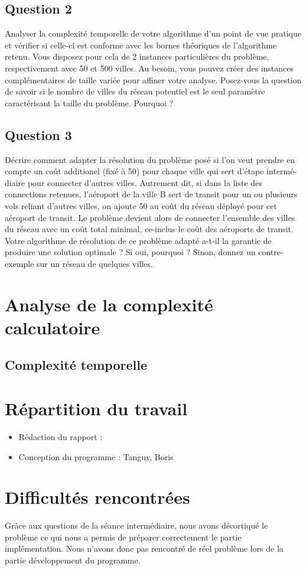 \documentclass[11pt]{article}
\begin{document}
\subsection*{Question 2}
Analyser la complexité temporelle de votre algorithme d’un point de vue pratique
et vérifier si celle-ci est conforme avec les bornes théoriques de l’algorithme retenu.
Vous disposez pour cela de 2 instances particulières du problème, respectivement
avec 50 et 500 villes. Au besoin, vous pouvez créer des instances complémentaires
de taille variée pour affiner votre analyse. Posez-vous la question de
savoir si le nombre de villes du réseau potentiel est le seul paramètre caractérisant
la taille du problème. Pourquoi ?



\subsection*{Question 3}
Décrire comment adapter la résolution du problème posé si l’on veut prendre en
compte un coût additionel (fixé à 50) pour chaque ville qui sert d’étape intermé-
diaire pour connecter d’autres villes. Autrement dit, si dans la liste des connections
retenues, l’aéroport de la ville B sert de transit pour un ou plusieurs vols
reliant d’autres villes, on ajoute 50 au coût du réseau déployé pour cet aéroport
de transit. Le problème devient alors de connecter l’ensemble des villes du réseau
avec un coût total minimal, ce-inclus le coût des aéroports de transit.
Votre algorithme de résolution de ce problème adapté a-t-il la garantie de produire
une solution optimale ? Si oui, pourquoi ? Sinon, donnez un contre-exemple sur
un réseau de quelques villes.




\section{Analyse de la complexité calculatoire}
\subsection{Complexité temporelle}

\section{Répartition du travail}

\begin{itemize}
\item Rédaction du rapport :
\item Conception du programme : Tanguy, Boris
\end{itemize}

\section{Difficultés rencontrées}
Grâce aux questions de la séance intermédiaire, nous avons décortiqué le problème ce qui nous a permis de préparer correctement le partie implémentation. Nous n'avons donc pas rencontré de réel problème lors de la partie développement du programme.
\end{document}
